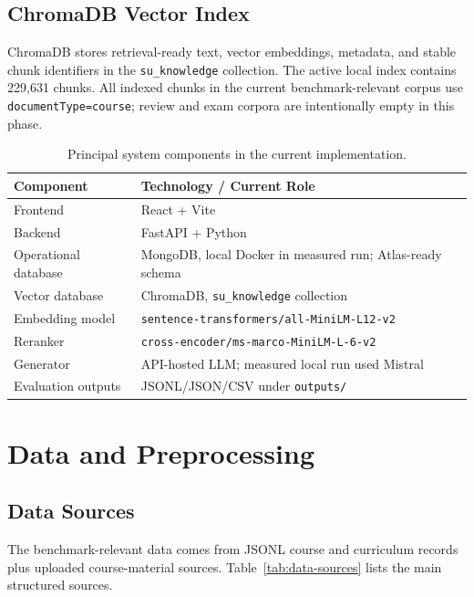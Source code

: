 \documentclass[11pt]{article}
\begin{document}
\subsection{ChromaDB Vector Index}
ChromaDB stores retrieval-ready text, vector embeddings, metadata, and stable chunk identifiers in the \texttt{su\_knowledge} collection. The active local index contains 229{,}631 chunks. All indexed chunks in the current benchmark-relevant corpus use \texttt{documentType=course}; review and exam corpora are intentionally empty in this phase.

\begin{table}[H]
\centering
\caption{Principal system components in the current implementation.}
\label{tab:components}
\begin{tabular}{ll}
\toprule
Component & Technology / Current Role \\
\midrule
Frontend & React + Vite \\
Backend & FastAPI + Python \\
Operational database & MongoDB, local Docker in measured run; Atlas-ready schema \\
Vector database & ChromaDB, \texttt{su\_knowledge} collection \\
Embedding model & \texttt{sentence-transformers/all-MiniLM-L12-v2} \\
Reranker & \texttt{cross-encoder/ms-marco-MiniLM-L-6-v2} \\
Generator & API-hosted LLM; measured local run used Mistral \\
Evaluation outputs & JSONL/JSON/CSV under \texttt{outputs/} \\
\bottomrule
\end{tabular}
\end{table}

\section{Data and Preprocessing}
\subsection{Data Sources}
The benchmark-relevant data comes from JSONL course and curriculum records plus uploaded course-material sources. Table~\ref{tab:data-sources} lists the main structured sources.
\end{document}

